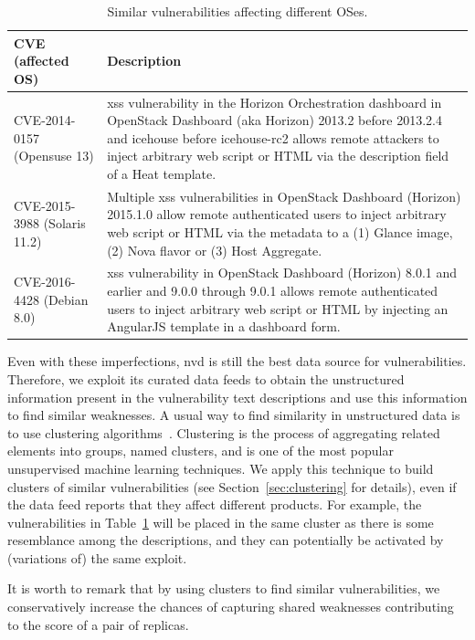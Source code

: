 \begin{table}[!t]
\begin{center}
{\small
\begin{tabular}{| p{2.8cm} | p{10.0cm} | }\hline
\textbf{CVE (affected OS)} & \textbf{Description} \\\hline\hline
CVE-2014-0157 (Opensuse 13) & \small \gls{xss} vulnerability in the Horizon Orchestration dashboard in OpenStack Dashboard (aka Horizon) 2013.2 before 2013.2.4 and icehouse before icehouse-rc2 allows remote attackers to inject arbitrary web script or HTML via the description field of a Heat template. \\ \hline
CVE-2015-3988 (Solaris 11.2) & \small Multiple \gls{xss} vulnerabilities in OpenStack Dashboard (Horizon) 2015.1.0 allow remote authenticated users to inject arbitrary web script or HTML via the metadata to a (1) Glance image, (2) Nova flavor or (3) Host Aggregate. \\ \hline
CVE-2016-4428 (Debian 8.0) & \small \gls{xss} vulnerability in OpenStack Dashboard (Horizon) 8.0.1 and earlier and 9.0.0 through 9.0.1 allows remote authenticated users to inject arbitrary web script or HTML by injecting an AngularJS template in a dashboard form. \\ \hline
\end{tabular}
}
\caption{Similar vulnerabilities affecting different OSes.}
\label{tab:missing_products}
\end{center}
\end{table}

Even with these imperfections, \gls{nvd} is still the best data source for vulnerabilities.
Therefore, we exploit its curated data feeds to obtain the unstructured information present in the vulnerability text descriptions and use this information to find similar weaknesses.
A usual way to find similarity in unstructured data is to use clustering algorithms~\cite{Jain:2010}.
Clustering is the process of aggregating related elements into groups, named clusters, and is one of the most popular unsupervised machine learning techniques. 
We apply this technique to build clusters of similar vulnerabilities (see Section~\ref{sec:clustering} for details), even if the data feed reports that they affect different products.
For example, the vulnerabilities in Table~\ref{tab:missing_products} will be placed in the same cluster as there is some resemblance among the descriptions, and they can potentially be activated by (variations of) the same exploit.

It is worth to remark that by using clusters to find similar vulnerabilities, we conservatively increase the chances of capturing shared weaknesses contributing to the score of a pair of replicas.


